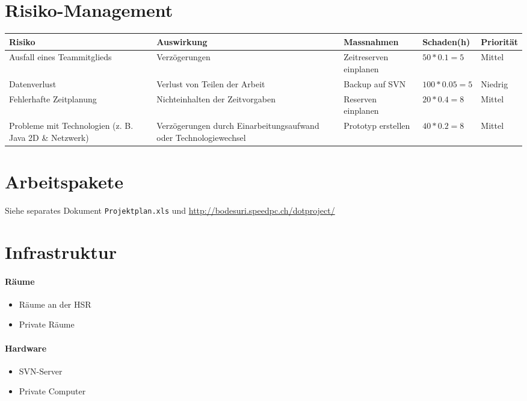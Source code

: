 \documentclass[a4paper,12pt,halfparskip,DIV14]{scrartcl}
\begin{document}
\section{Risiko-Management}

\begin{tabular}{@{} p{2.7cm} p{3.6cm} p{4cm} l l @{}}
\toprule
\textbf{Risiko} &
\textbf{Auswirkung} &
\textbf{Massnahmen} &
\textbf{Schaden\footnotemark (h)} &
\textbf{Priorität} \\
\midrule
Ausfall eines Teammitglieds & Verzögerungen & Zeitreserven einplanen  & $50 * 0.1 = 5$ & Mittel \\
\midrule
Datenverlust & Verlust von Teilen der Arbeit & Backup auf SVN & $100 * 0.05 = 5$ & Niedrig \\
\midrule
Fehlerhafte Zeitplanung & Nichteinhalten der Zeitvorgaben & Reserven einplanen & $20 * 0.4 = 8$ & Mittel \\
\midrule
Probleme mit Technologien (z. B. Java 2D \&  Netzwerk) & Verzögerungen durch Einarbeitungsaufwand oder Technologiewechsel & Prototyp erstellen & $40 * 0.2 = 8$ & Mittel \\
\bottomrule
\end{tabular}


\section{Arbeitspakete}

Siehe separates Dokument \texttt{Projektplan.xls} und \url{http://bodesuri.speedpc.ch/dotproject/}

\section{Infrastruktur}

\paragraph{Räume}
\begin{itemize}
	\item Räume an der HSR
	\item Private Räume
\end{itemize}

\paragraph{Hardware}
\begin{itemize}
	\item SVN-Server
	\item Private Computer
\end{itemize}
\end{document}
